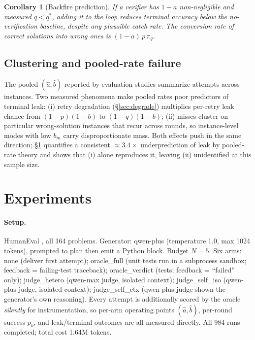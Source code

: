 \documentclass[11pt]{article}
\newtheorem{corollary}{Corollary}
\begin{document}
\begin{corollary}[Backfire prediction]\label{cor:backfire}
If a verifier has $1-a$ non-negligible and measured $q < q^\ast$,
adding it to the loop reduces terminal accuracy below the
no-verification baseline, despite any plausible catch rate.  The
conversion rate of correct solutions into wrong ones is
$(1-a)\,p\,\pi_q$.
\end{corollary}

\subsection{Clustering and pooled-rate failure}\label{sec:cluster}

The pooled $(\hat a, \hat b)$ reported by evaluation studies
summarize attempts across instances.  Two measured phenomena make
pooled rates poor predictors of terminal leak: (i) retry degradation
(§\ref{sec:degrade}) multiplies per-retry leak chance from
$(1-p)(1-b)$ to $(1-q)(1-b)$; (ii) misses cluster on particular
wrong-solution instances that recur across rounds, so
instance-level modes with low $b_m$ carry disproportionate mass.
Both effects push in the same direction; §\ref{sec:exp} quantifies a
consistent $\approx 3.4\times$ underprediction of leak by
pooled-rate theory and shows that (i) alone reproduces it, leaving
(ii) unidentified at this sample size.

\section{Experiments}\label{sec:exp}

\paragraph{Setup.}
HumanEval \citep{chen2021humaneval}, all 164 problems.  Generator:
qwen-plus (temperature 1.0, max 1024 tokens), prompted to plan then
emit a Python block.  Budget $N=5$.  Six arms: \textsf{none}
(deliver first attempt); \textsf{oracle\_full} (unit tests run in a
subprocess sandbox; feedback = failing-test traceback);
\textsf{oracle\_verdict} (tests; feedback = ``failed'' only);
\textsf{judge\_hetero} (qwen-max judge, isolated context);
\textsf{judge\_self\_iso} (qwen-plus judge, isolated context);
\textsf{judge\_self\_ctx} (qwen-plus judge shown the generator's own
reasoning).  Every attempt is additionally scored by the oracle
\emph{silently} for instrumentation, so per-arm operating points
$(\hat a, \hat b)$, per-round success $p_k$, and leak/terminal
outcomes are all measured directly.  All 984 runs completed; total
cost 1.64M tokens.
\end{document}
